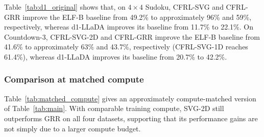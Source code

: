 \begin{table}[H]
\centering\small\color{blue}
\caption{\textcolor{blue}{Test accuracy (\%) on d1's original benchmarks. The LLaDA results are reported by d1~\citep{zhao2025d1}; ELF-B results are averaged over five sampler seeds.}}
\label{tab:d1_original}
\end{table}

Table~\ref{tab:d1_original} shows that, on $4\times4$ Sudoku, CFRL-SVG and CFRL-GRR improve the ELF-B baseline from 49.2\% to approximately 96\% and 59\%, respectively, whereas d1-LLaDA improves its baseline from 11.7\% to 22.1\%. On Countdown-3, CFRL-SVG-2D and CFRL-GRR improve the ELF-B baseline from 41.6\% to approximately 63\% and 43.7\%, respectively (CFRL-SVG-1D reaches 61.4\%), whereas d1-LLaDA improves its baseline from 20.7\% to 42.2\%.
\endgroup

\begingroup
\color{blue}
\subsubsection{Comparison at matched compute}
\label{app:matched_compute}
Table~\ref{tab:matched_compute} gives an approximately compute-matched version of Table~\ref{tab:main}. With comparable training compute, SVG-2D still outperforms GRR on all four datasets, supporting that its performance gains are not simply due to a larger compute budget.

